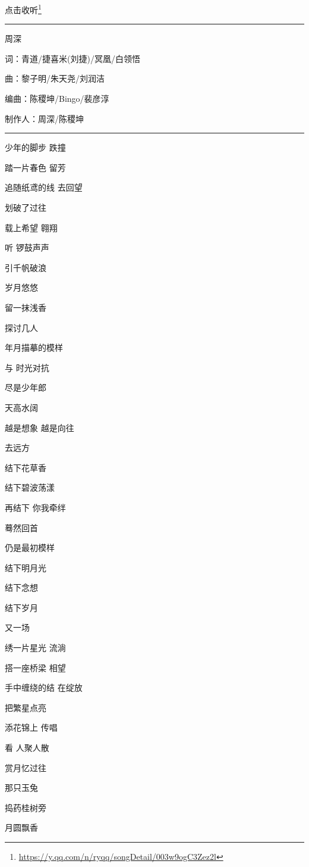 \documentclass[]{ctexbook}
\renewcommand{\href}[2]{#2\footnote{\url{#1}}}
\begin{document}
\href{https://y.qq.com/n/ryqq/songDetail/003w9ogC3Zez2l}{点击收听}

\begin{center}\rule{0.5\linewidth}{0.5pt}\end{center}

周深

词：青道/捷喜米(刘捷)/冥凰/白领悟

曲：黎子明/朱天尧/刘润洁

编曲：陈稷坤/Bingo/裴彦淳

制作人：周深/陈稷坤

\begin{center}\rule{0.5\linewidth}{0.5pt}\end{center}

少年的脚步 跌撞

踏一片春色 留芳

追随纸鸢的线 去回望

划破了过往

载上希望 翱翔

听 锣鼓声声

引千帆破浪

岁月悠悠

留一抹浅香

探讨几人

年月描摹的模样

与 时光对抗

尽是少年郎

天高水阔

越是想象 越是向往

去远方

结下花草香

结下碧波荡漾

再结下 你我牵绊

蓦然回首

仍是最初模样

结下明月光

结下念想

结下岁月

又一场

绣一片星光 流淌

搭一座桥梁 相望

手中缠绕的结 在绽放

把繁星点亮

添花锦上 传唱

看 人聚人散

赏月忆过往

那只玉兔

捣药桂树旁

月圆飘香
\end{document}
